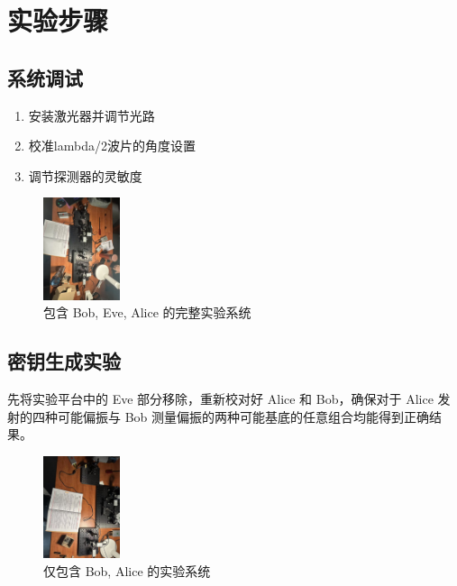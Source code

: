 \documentclass{ctexart}
\begin{document}
\section{实验步骤}
\subsection{系统调试}
\begin{enumerate}
\item 安装激光器并调节光路
\item 校准lambda/2波片的角度设置
\item 调节探测器的灵敏度
\end{enumerate}

\begin{figure}[htbp]
    \centering
    \includegraphics[width=0.2\textwidth,height=0.3\textwidth]{pictures/微信图片_20241031162855.jpg}
    \caption{包含 Bob, Eve, Alice 的完整实验系统}
\end{figure}

\subsection{密钥生成实验}
先将实验平台中的 Eve 部分移除，重新校对好 Alice 和 Bob，确保对于 Alice 发射的四种可能偏振与 Bob 测量偏振的两种可能基底的任意组合均能得到正确结果。

\begin{figure}[htbp]
    \centering
    \includegraphics[width=0.2\textwidth,height=0.3\textwidth]{pictures/微信图片_20241031162758.jpg}
    \caption{仅包含 Bob, Alice 的实验系统}
\end{figure}
\end{document}
